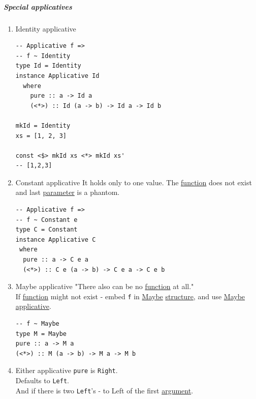 \documentclass[11pt]{article}
\begin{document}
\subparagraph{\label{org9137057}Special applicatives}
\label{sec:org7415b57}
\begin{enumerate}
\item \label{orge5e5506}Identity applicative
\label{sec:orga77c26f}
\begin{verbatim}
-- Applicative f =>
-- f ~ Identity
type Id = Identity
instance Applicative Id
  where
    pure :: a -> Id a
    (<*>) :: Id (a -> b) -> Id a -> Id b

mkId = Identity
xs = [1, 2, 3]

const <$> mkId xs <*> mkId xs'
-- [1,2,3]
\end{verbatim}

\item \label{org91482ef}Constant applicative
\label{sec:orgd69da56}
It holds only to one value. The \hyperref[orge15bc14]{function} does not exist and last \hyperref[org0e7674e]{parameter} is a phantom.\\
\begin{verbatim}
-- Applicative f =>
-- f ~ Constant e
type C = Constant
instance Applicative C
 where
  pure :: a -> C e a
  (<*>) :: C e (a -> b) -> C e a -> C e b
\end{verbatim}

\item \label{org5bbab6f}Maybe applicative
\label{sec:org7e8dc8b}
"There also can be no \hyperref[orge15bc14]{function} at all."\\

If \hyperref[orge15bc14]{function} might not exist - embed \texttt{f} in \hyperref[org8347bae]{Maybe} \hyperref[org8051f61]{structure}, and use \hyperref[org8347bae]{Maybe} \hyperref[org2dfdf4a]{applicative}.\\
\begin{verbatim}
-- f ~ Maybe
type M = Maybe
pure :: a -> M a
(<*>) :: M (a -> b) -> M a -> M b
\end{verbatim}

\item \label{org85aef47}Either applicative
\label{sec:org5309cb2}
\texttt{pure} is \texttt{Right}.\\
Defaults to \texttt{Left}.\\
And if there is two \texttt{Left}'s - to Left of the first \hyperref[orga6b7e97]{argument}.\\


\end{enumerate}
\end{document}
